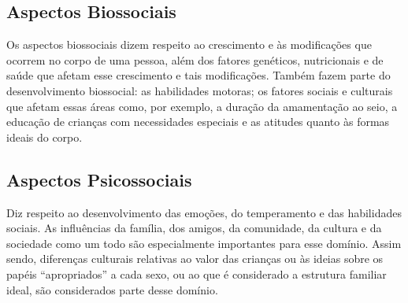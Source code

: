 \subsection{Aspectos Biossociais}

Os aspectos biossociais dizem respeito ao crescimento e às modificações que ocorrem no corpo de uma pessoa, além dos fatores genéticos, nutricionais e de saúde que afetam esse crescimento e tais modificações. Também fazem parte do desenvolvimento biossocial: as habilidades motoras; os fatores sociais e culturais que afetam essas áreas como, por exemplo, a duração da amamentação ao seio, a educação de crianças com necessidades especiais e as atitudes quanto às formas ideais do corpo.


\subsection{Aspectos Psicossociais}

Diz respeito ao desenvolvimento das emoções, do temperamento e das habilidades sociais. As influências da família, dos amigos, da comunidade, da cultura e da sociedade como um todo são especialmente importantes para esse domínio. Assim sendo, diferenças culturais relativas ao valor das crianças ou às ideias sobre os papéis “apropriados” a cada sexo, ou ao que é considerado a estrutura familiar ideal, são considerados parte desse domínio.

